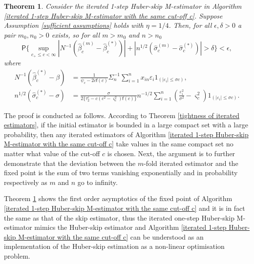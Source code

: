 \documentclass[11pt, letterpaper]{article}
\newtheorem{theorem}{Theorem}
\numberwithin{algorithm}{section}
\numberwithin{assumption}{section}
\numberwithin{lemma}{section}
\numberwithin{theorem}{section}
\numberwithin{corollary}{section}
\numberwithin{remark}{section}
\numberwithin{equation}{section}
\numberwithin{figure}{section}
\numberwithin{table}{section}
\begin{document}
\begin{theorem} \label{fixed point of iterated estimators}
Consider the iterated 1-step Huber-skip M-estimator in Algorithm \ref{iterated 1-step Huber-skip M-estimator with the same cut-off c}. Suppose Assumption \ref{sufficient assumptions} holds with $\eta = 1/4$. Then, for all $\epsilon, \delta > 0$ a pair $m_{0}, n_{0} > 0$ exists, so for all $m > m_{0}$ and $n > n_{0}$
\begin{equation*}
\mathsf{P} \{ \sup_{c_{+} \le c < \infty} | N^{-1}(\widehat{\beta}_{c}^{(m)} - \widehat{\beta}_{c}^{(\ast)}) | + | n^{1/2}(\widehat{\sigma}_{c}^{(m)} - \widehat{\sigma}_{c}^{(\ast)}) | > \delta \} < \epsilon,
\end{equation*}
where
\begin{align*}
N^{-1}(\widehat{\beta}_{c}^{(\ast)} - \beta) & = \frac{1}{\psi_{c} - 2c\mathsf{f}(c)} \Sigma_{n}^{-1} \sum_{i=1}^{n} x_{in} \varepsilon_{i} 1_{(|\varepsilon_{i}| \le \sigma c)}, \\
n^{1/2}(\widehat{\sigma}_{c}^{(\ast)} - \sigma) & = \frac{\sigma}{2 \{ \tau_{2}^{c} - c(c^{2} - \varsigma_{c}^{2})\mathsf{f}(c) \}} n^{-1/2}  \sum_{i=1}^{n} (\frac{\varepsilon_{i}^{2}}{\sigma^{2}} - \varsigma_{c}^{2}) 1_{(|\varepsilon_{i}| \le \sigma c)}.
\end{align*}
\end{theorem}

The proof is conducted as follows. According to Theorem \ref{tightness of iterated estimators}, if the initial estimator is bounded in a large compact set with a large probability, then any iterated estimators of Algorithm \ref{iterated 1-step Huber-skip M-estimator with the same cut-off c} take values in the same compact set no matter what value of the cut-off $c$ is chosen. Next, the argument is to further demonstrate that the deviation between the $m$-fold iterated estimator and the fixed point is the sum of two terms vanishing exponentially and in probability respectively as $m$ and $n$ go to infinity.

Theorem \ref{fixed point of iterated estimators} shows the first order asymptotics of the fixed point of Algorithm \ref{iterated 1-step Huber-skip M-estimator with the same cut-off c} and it is in fact the same as that of the \cite{huber1964robust} skip estimator, thus the iterated one-step Huber-skip M-estimator mimics the Huber-skip estimator and Algorithm \ref{iterated 1-step Huber-skip M-estimator with the same cut-off c} can be understood as an implementation of the Huber-skip estimation as a non-linear optimisation problem.
\end{document}
